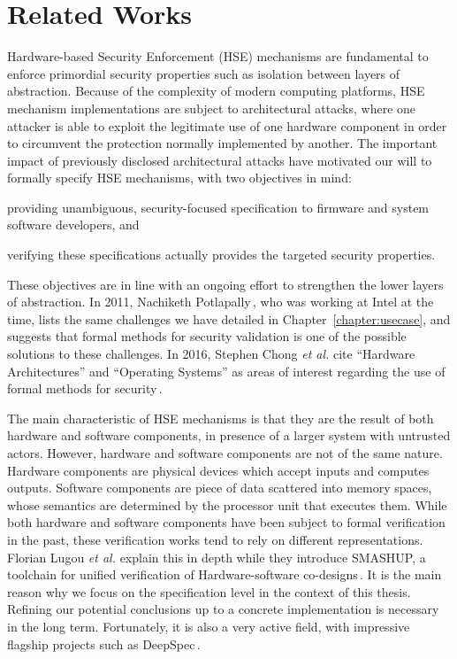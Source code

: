 \chapter{Related Works}
\label{chapter:relatedwork}


\vspace{1cm}\noindent
%
Hardware-based Security Enforcement (HSE) mechanisms are fundamental to enforce
primordial security properties such as isolation between layers of abstraction.
%
Because of the complexity of modern computing platforms, HSE mechanism
implementations are subject to architectural attacks, where one attacker is able
to exploit the legitimate use of one hardware component in order to circumvent
the protection normally implemented by another.
%
The important impact of previously disclosed architectural attacks have
motivated our will to formally specify HSE mechanisms, with two objectives in
mind:
%
\begin{inparaenum}[(1)]
\item providing unambiguous, security-focused specification to firmware and
  system software developers, and
%
\item verifying these specifications actually provides the targeted security
  properties.
\end{inparaenum}
%
These objectives are in line with an ongoing effort to strengthen the lower
layers of abstraction.
%
In 2011, Nachiketh Potlapally\,\cite{potlapally2011hardwaresecurity}, who was
working at Intel at the time, lists the same challenges we have detailed in
Chapter~\ref{chapter:usecase}, and suggests that formal methods for security
validation is one of the possible solutions to these challenges.
%
In 2016, Stephen Chong \emph{et al.} cite ``Hardware Architectures'' and
``Operating Systems'' as areas of interest regarding the use of formal methods
for security\,\cite{chong2016report}.

The main characteristic of HSE mechanisms is that they are the result of both
hardware and software components, in presence of a larger system with untrusted
actors.
%
However, hardware and software components are not of the same nature.
%
Hardware components are physical devices which accept inputs and computes
outputs.
%
Software components are piece of data scattered into memory spaces, whose
semantics are determined by the processor unit that executes them.
%
While both hardware and software components have been subject to formal
verification in the past, these verification works tend to rely on different
representations.
%
Florian Lugou \emph{et al.} explain this in depth while they introduce SMASHUP,
a toolchain for unified verification of Hardware-software
co-designs\,\cite{lugou2017smashup}.
%
It is the main reason why we focus on the specification level in the context of
this thesis.
%
Refining our potential conclusions up to a concrete implementation is necessary
in the long term.
%
Fortunately, it is also a very active field, with impressive flagship projects
such as DeepSpec\,\cite{appel2017deepspec}.

